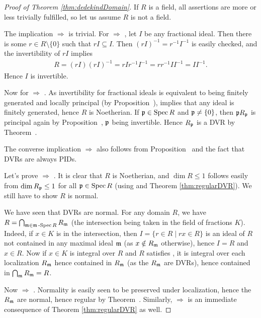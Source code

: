 \documentclass[a4paper,parskip=half,numbers=enddot, DIV=12]{scrreprt}
\begin{document}
\begin{proof}[Proof of Theorem \ref{thm:dedekindDomain}]
If $R$ is a field, all assertions are more or less trivially fulfilled, so let us assume $R$ is not a field.

The implication  $\Rightarrow$  is trivial. For  $\Rightarrow$ , let $I$ be any fractional ideal. Then there is some $r\in R\setminus\{0\}$ such
that $rI\subseteq I$. Then $(rI)^{-1} = r^{-1} I^{-1}$ is easily checked,
and the invertibility of $rI$ implies
\begin{align*}
R = (rI)(rI)^{-1} = r I r^{-1} I^{-1} = rr^{-1} I I^{-1} = I I^{-1}.
\end{align*}
Hence $I$ is invertible.

Now for  $\Rightarrow$ . As invertibility for fractional ideals is equivalent to being finitely generated and locally principal
(by Proposition~),
 implies that any ideal is finitely generated, hence
$R$ is Noetherian. If $\mathfrak{p} \in \operatorname{Spec} R$ and $\mathfrak{p}\neq \{0\}$, then  $\mathfrak{p} R_{\mathfrak{p}}$ is principal again by Proposition~, $\mathfrak{p}$ being invertible.  Hence $R_{\mathfrak{p}}$ is a DVR by Theorem~. 

The converse implication  $\Rightarrow$  also follows from Proposition~ and the fact that DVRs are always PIDs.

Let's prove  $\Rightarrow$ . It is clear that $R$ is Noetherian, and $\dim R\leq 1$ follows easily from
$\dim R_{\mathfrak{p}}\leq 1$ for all $\mathfrak{p}\in \operatorname{Spec} R$ (using  and Theorem \ref{thm:regularDVR}). We still have to show $R$ is normal.

We have seen that DVRs are normal. For any domain $R$, we have $R=\bigcap_{\mathfrak{m} \in \mathfrak{m}\operatorname{-Spec} R} R_{\mathfrak{m}}$ (the intersection being
taken in the field of fractions $K$). Indeed, if $x\in K$
is in the intersection, then $I=\{r\in R \mid rx\in R\}$ is an ideal of $R$ not contained
in any maximal ideal $\mathfrak{m}$ (as $x\notin R_{\mathfrak{m}}$ otherwise), hence $I=R$ and $x\in R$. 
Now if $x\in K$ is integral over $R$ and $R$ satisfies , it is integral over each localization $R_{\mathfrak{m}}$ hence contained in $R_{\mathfrak{m}}$ (as the $R_{\mathfrak{m}}$ are DVRs),
hence contained in $\bigcap_{\mathfrak{m}} R_{\mathfrak{m}} = R$.

Now  $\Rightarrow$ . Normality is easily seen to be preserved under localization, hence the $R_{\mathfrak{m}}$ are normal, hence
regular by Theorem~. Similarly,  $\Rightarrow$  is an immediate consequence of Theorem \ref{thm:regularDVR} as well.


\end{proof}
\end{document}
